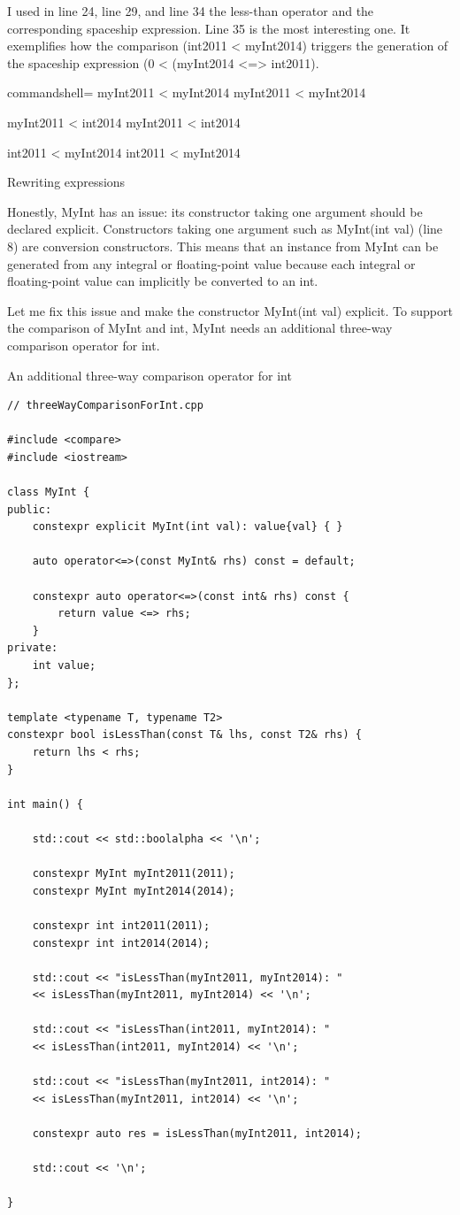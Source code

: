 I used in line 24, line 29, and line 34 the less-than operator and the corresponding spaceship expression. Line 35 is the most interesting one. It exemplifies how the comparison (int2011 < myInt2014) triggers the generation of the spaceship expression (0 < (myInt2014 <=> int2011).

\begin{tcblisting}{commandshell={}}
myInt2011 < myInt2014
myInt2011 < myInt2014

myInt2011 < int2014
myInt2011 < int2014

int2011 < myInt2014
int2011 < myInt2014
\end{tcblisting}

\begin{center}
Rewriting expressions
\end{center}

Honestly, MyInt has an issue: its constructor taking one argument should be declared explicit. Constructors taking one argument such as MyInt(int val) (line 8) are conversion constructors. This means that an instance from MyInt can be generated from any integral or floating-point value because each integral or floating-point value can implicitly be converted to an int.

Let me fix this issue and make the constructor MyInt(int val) explicit. To support the comparison of MyInt and int, MyInt needs an additional three-way comparison operator for int.

\noindent
An additional three-way comparison operator for int
\begin{lstlisting}[style=styleCXX]
// threeWayComparisonForInt.cpp

#include <compare>
#include <iostream>

class MyInt {
public:
	constexpr explicit MyInt(int val): value{val} { }
	
	auto operator<=>(const MyInt& rhs) const = default;
	
	constexpr auto operator<=>(const int& rhs) const {
		return value <=> rhs;
	}
private:
	int value;
};

template <typename T, typename T2>
constexpr bool isLessThan(const T& lhs, const T2& rhs) {
	return lhs < rhs;
}

int main() {

	std::cout << std::boolalpha << '\n';
	
	constexpr MyInt myInt2011(2011);
	constexpr MyInt myInt2014(2014);
	
	constexpr int int2011(2011);
	constexpr int int2014(2014);
	
	std::cout << "isLessThan(myInt2011, myInt2014): "
	<< isLessThan(myInt2011, myInt2014) << '\n';
	
	std::cout << "isLessThan(int2011, myInt2014): "
	<< isLessThan(int2011, myInt2014) << '\n';
	
	std::cout << "isLessThan(myInt2011, int2014): "
	<< isLessThan(myInt2011, int2014) << '\n';
	
	constexpr auto res = isLessThan(myInt2011, int2014);
	
	std::cout << '\n';

}
\end{lstlisting}

